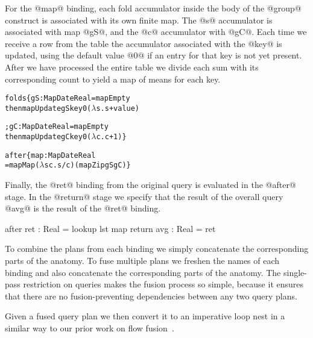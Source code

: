 For the @map@ binding, each fold accumulator inside the body of the @group@ construct is associated with its own finite map. The @s@ accumulator is associated with map @gS@, and the @c@ accumulator with @gC@. Each time we receive a row from the table the accumulator associated with the @key@ is updated, using the default value @0@ if an entry for that key is not yet present. After we have processed the entire table we divide each sum with its corresponding count to yield a map of means for each key.
\begin{alltt}
  folds  \{ gS  : Map Date Real = mapEmpty
           then mapUpdate gS key 0 (\(\lambda\)s. s + value)

         ; gC  : Map Date Real = mapEmpty
           then mapUpdate gC key 0 (\(\lambda\)c. c + 1) \}

  after  \{ map : Map Date Real
            = mapMap (\(\lambda\)s c. s / c) (mapZip gS gC) \}
\end{alltt}


Finally, the @ret@ binding from the original query is evaluated in the @after@ stage. In the @return@ stage we specify that the result of the overall query @avg@ is the result of the @ret@ binding.
\begin{code}
  after  { ret : Real = lookup lst map }
  return { avg : Real = ret }
\end{code}

To combine the plans from each binding we simply concatenate the corresponding parts of the anatomy. To fuse multiple plans we freshen the names of each binding and also concatenate the corresponding parts of the anatomy. The single-pass restriction on queries makes the fusion process so simple, because it ensures that there are no fusion-preventing dependencies between any two query plans. 

Given a fused query plan we then convert it to an imperative loop nest in a similar way to our prior work on flow fusion~\cite{lippmeier2013data}.

